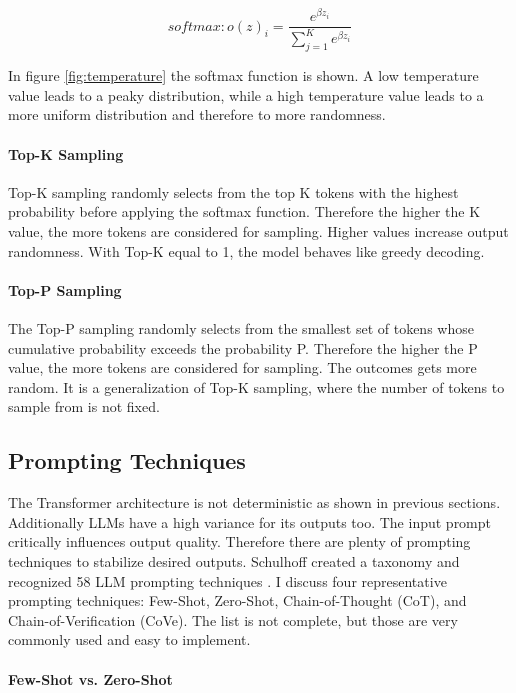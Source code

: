 $$softmax: o(z)_i = \frac{e^{\beta z_i}}{\sum_{j=1}^K e^{\beta z_i}}$$

In figure \ref{fig:temperature} the softmax function is shown. A low temperature value leads to a peaky distribution, while a high temperature value leads to a more uniform distribution and therefore to more randomness.


\paragraph{Top-K Sampling}
Top-K sampling \cite{Fan.13.05.2018} randomly selects from the top K tokens with the highest probability before applying the softmax function. Therefore the higher the K value, the more tokens are considered for sampling. Higher values increase output randomness. With Top-K equal to 1, the model behaves like greedy decoding.

\paragraph{Top-P Sampling}
The Top-P sampling \cite{Holtzman.22.04.2019} randomly selects from the smallest set of tokens whose cumulative probability exceeds the probability P. Therefore the higher the P value, the more tokens are considered for sampling. The outcomes gets more random. It is a generalization of Top-K sampling, where the number of tokens to sample from is not fixed.

\subsection{Prompting Techniques}
The Transformer architecture is not deterministic as shown in previous sections. Additionally LLMs have a high variance for its outputs too. The input prompt critically influences output quality. Therefore there are plenty of prompting techniques to stabilize desired outputs. Schulhoff created a taxonomy and recognized 58 LLM prompting techniques \cite{Schulhoff.06.06.2024}. I discuss four representative prompting techniques: Few-Shot, Zero-Shot, Chain-of-Thought (CoT), and Chain-of-Verification (CoVe). The list is not complete, but those are very commonly used and easy to implement.

\paragraph{Few-Shot vs. Zero-Shot}

